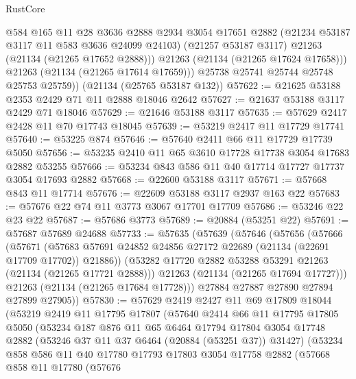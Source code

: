 \begin{lexlean}{RustCore}
\begin{coremodule}
              @584
              @165
              @11
              @28
              @3636
              @2888
              @2934
              @3054
              @17651
              @2882
              (@21234 @53187 @3117 @11 @583 @3636 @24099 @24103)
              (@21257 @53187 @3117)
              @21263
              (@21134 (@21265 @17652 @2888)))
            @21263
            (@21134 (@21265 @17624 @17658)))
          @21263
          (@21134 (@21265 @17614 @17659)))
        @25738
        @25741
        @25744
        @25748
        @25753
        @25759))
    (@21134 (@25765 @53187 @132))
@57622 := @21625 @53188 @2353 @2429 @71 @11 @2888 @18046 @2642
@57627 := @21637 @53188 @3117 @2429 @71 @18046
@57629 := @21646 @53188 @3117
@57635 := @57629 @2417 @2428 @11 @70 @17743 @18045
@57639 := @53219 @2417 @11 @17729 @17741
@57640 := @53225 @874
@57646 := @57640 @2411 @66 @11 @17729 @17739 @5050
@57656 := @53235 @2410 @11 @65 @3610 @17728 @17738 @3054 @17683 @2882 @53255
@57666 := @53234 @843 @586 @11 @40 @17714 @17727 @17737 @3054 @17693 @2882
@57668 := @22600 @53188 @3117
@57671 := @57668 @843 @11 @17714
@57676 := @22609 @53188 @3117 @2937 @163 @22
@57683 := @57676 @22 @74 @11 @3773 @3067 @17701 @17709
@57686 := @53246 @22 @23 @22
@57687 := @57686 @3773
@57689 := @20884 (@53251 @22)
@57691 := @57687 @57689 @24688
@57733 := @57635
    (@57639
      (@57646
        (@57656
          (@57666
            (@57671
              (@57683 @57691 @24852 @24856 @27172 @22689 (@21134 (@22691 @17709 @17702)) @21886))
            (@53282 @17720 @2882 @53288 @53291 @21263 (@21134 (@21265 @17721 @2888)))
            @21263
            (@21134 (@21265 @17694 @17727)))
          @21263
          (@21134 (@21265 @17684 @17728)))
        @27884
        @27887
        @27890
        @27894
        @27899
        @27905))
@57830 := @57629
    @2419
    @2427
    @11
    @69
    @17809
    @18044
    (@53219
      @2419
      @11
      @17795
      @17807
      (@57640
        @2414
        @66
        @11
        @17795
        @17805
        @5050
        (@53234
          @187
          @876
          @11
          @65
          @6464
          @17794
          @17804
          @3054
          @17748
          @2882
          (@53246 @37 @11 @37 @6464 (@20884 (@53251 @37)) @31427)
          (@53234
            @858
            @586
            @11
            @40
            @17780
            @17793
            @17803
            @3054
            @17758
            @2882
            (@57668
              @858
              @11
              @17780
              (@57676

\end{coremodule}
\end{lexlean}
